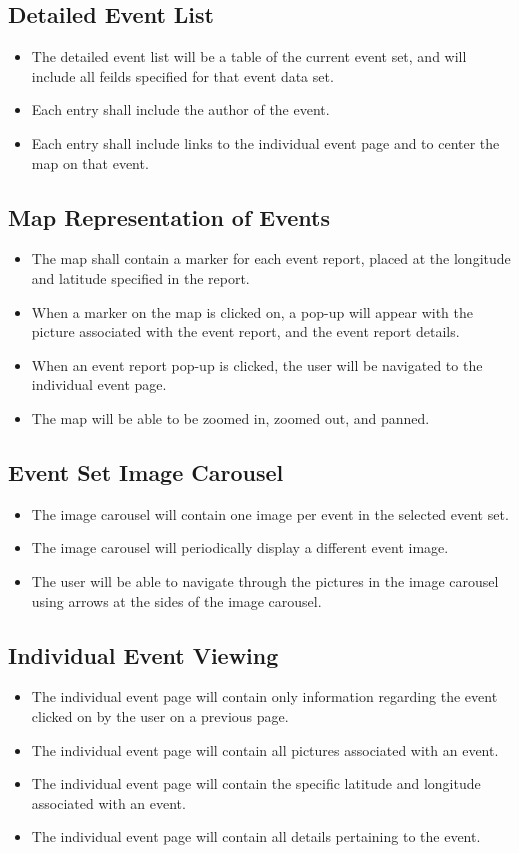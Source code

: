 \subsection{Detailed Event List}
\begin{itemize}
\item The detailed event list will be a table of the current event set, and will include all feilds specified for that event data set.
\item Each entry shall include the author of the event.
\item Each entry shall include links to the individual event page and to center the map on that event.
\end{itemize}

\subsection{Map Representation of Events}
\begin{itemize}
\item The map shall contain a marker for each event report, placed at the longitude and latitude specified in the report.
\item When a marker on the map is clicked on, a pop-up will appear with the picture associated with the event report, and the event report details. 
\item When an event report pop-up is clicked, the user will be navigated to the individual event page.
\item The map will be able to be zoomed in, zoomed out, and panned.
\end{itemize}

\subsection{Event Set Image Carousel}
\begin{itemize}
\item The image carousel will contain one image per event in the selected event set.
\item The image carousel will periodically display a different event image.
\item The user will be able to navigate through the pictures in the image carousel using arrows at the sides of the image carousel.
\end{itemize}

\subsection{Individual Event Viewing}
\begin{itemize}
\item The individual event page will contain only information regarding the event clicked on by the user on a previous page.
\item The individual event page will contain all pictures associated with an event.
\item The individual event page will contain the specific latitude and longitude associated with an event.
\item The individual event page will contain all details pertaining to the event.
\end{itemize}

